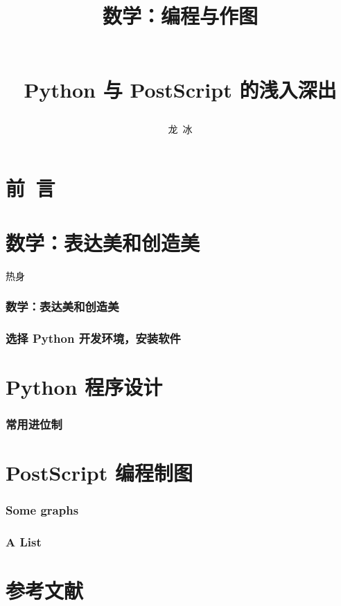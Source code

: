 \documentclass[zihao=-4,linespread=1.5,heading=true,a4paper,twoside]{ctexbook}
\title{\begin{kaishu}数学：编程与作图\end{kaishu}\\
	Python 与 PostScript 的浅入深出}
\author{\kaishu 龙\,  冰}
\begin{document}
\begin{titlepage}
	\maketitle
\end{titlepage}
\tableofcontents
\part{\kaishu 前\, 言}\label{sec:preface}


\part{数学：表达美和创造美}
热身
\section{数学：表达美和创造美}\label{sec:I.1}




\section{选择 Python 开发环境，安装软件}\label{sec:II.2}


\newpage\part{Python 程序设计}
\section{常用进位制}\label{sec:II.2}



\newpage\part{PostScript 编程制图}
\section{Some graphs}


\section{A List}


\newpage\part*{参考文献}
\printbibliography[heading=none]
\end{document}
